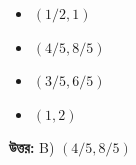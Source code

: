 \documentclass[12pt, a4paper]{article}
\begin{document}
\begin{itemize}[label={}, leftmargin=1cm, itemsep=0.5em]
    \item[\textbf{A)}] $(1/2, 1)$
    \item[\textbf{B)}] $(4/5, 8/5)$
    \item[\textbf{C)}] $(3/5, 6/5)$
    \item[\textbf{D)}] $(1, 2)$
\end{itemize}

\vspace{0.5em}
\begin{tcolorbox}[answerbox]
    \textbf{\color{success} উত্তর:} B) $(4/5, 8/5)$
\end{tcolorbox}
\vspace{1em}
\end{document}
